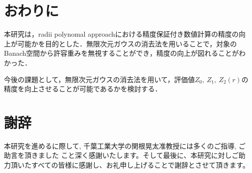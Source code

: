 
\chapter{おわりに}
本研究は，radii polynomal approachにおける精度保証付き数値計算の精度の向上が可能かを目的とした．無限次元ガウスの消去法を用いることで，対象のBanach空間から許容重みを無視することができ，精度の向上が図れることがわかった．

今後の課題として，無限次元ガウスの消去法を用いて，評価値$Z_0,\ Z_1,\ Z_2(r)$の精度を向上させることが可能であるかを検討する．

\chapter*{謝辞}
本研究を進めるに際して, 千葉工業大学の関根晃太准教授には多くのご指導, ご助言を頂きました
こと深く感謝いたします。そして最後に、本研究に対しご助力頂いたすべての皆様に感謝し、お礼申し上げることで謝辞とさせて頂きます。
